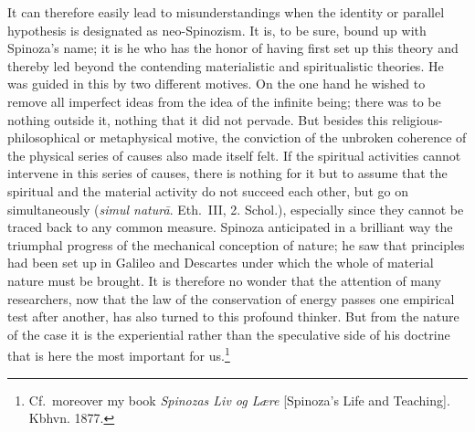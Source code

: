 \documentclass[12pt,a4paper]{book}
\newcommand{\opage}[1]{\marginnote{\footnotesize\textit{[#1]}}}
\begin{document}
\opage{81}It can therefore easily lead to misunderstandings when the
identity or parallel hypothesis is designated as neo-Spinozism. It is,
to be sure, bound up with Spinoza's name; it is he who has the honor of
having first set up this theory and thereby led beyond the contending
materialistic and spiritualistic theories. He was guided in this by two
different motives. On the one hand he wished to remove all imperfect
ideas from the idea of the infinite being; there was to be nothing
outside it, nothing that it did not pervade. But besides this
religious-philosophical or metaphysical motive, the conviction of the
unbroken coherence of the physical series of causes also made itself
felt. If the spiritual activities cannot intervene in this series of
causes, there is nothing for it but to assume that the spiritual and the
material activity do not succeed each other, but go on simultaneously
(\textit{simul naturā}. Eth.\ III, 2. Schol.), especially since they
cannot be traced back to any common measure. Spinoza anticipated in a
brilliant way the triumphal progress of the mechanical conception of
nature; he saw that principles had been set up in Galileo and Descartes
under which the whole of material nature must be brought. It is
therefore no wonder that the attention of many researchers, now that the
law of the conservation of energy passes one empirical test after
another, has also turned to this profound thinker. But from the nature
of the case it is the experiential rather than the speculative side of
his doctrine that is here the most important
for us.\footnote{Cf.\ moreover my book \textit{Spinozas Liv og Lære}
[Spinoza's Life and Teaching]. Kbhvn. 1877.}
\end{document}
